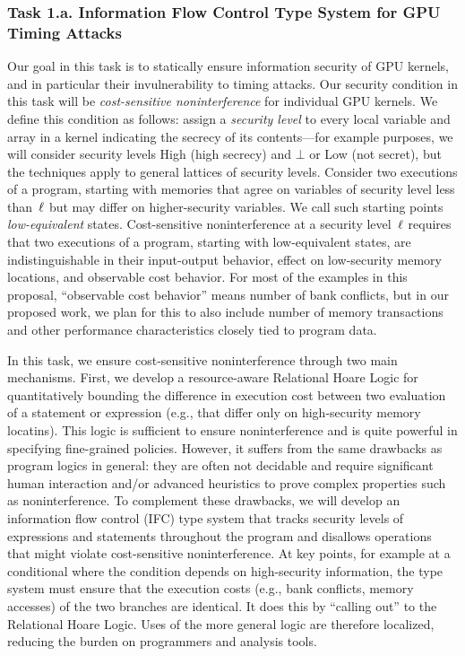 \subsubsection{Task 1.a. Information Flow Control Type System for GPU Timing Attacks}

Our goal in this task is to statically ensure information security of GPU kernels, and in particular their invulnerability to timing attacks.
%
Our security condition in this task will be {\em cost-sensitive noninterference}  for individual GPU kernels.
%
We define this condition as follows: assign a {\em security level} to every local variable and array in a kernel indicating the secrecy of its contents---for example purposes, we will consider security levels High (high secrecy) and $\bot$ or Low (not secret), but the techniques apply to general lattices of security levels.
%
Consider two executions of a program, starting with memories that agree on variables of security level less than~$\ell$ but may differ on higher-security variables.
%
We call such starting points {\em low-equivalent} states.
%
Cost-sensitive noninterference at a security level~$\ell$ requires that two executions of a program, starting with low-equivalent states, are indistinguishable in their input-output behavior, effect on low-security memory locations, and observable cost behavior.
%
For most of the examples in this proposal, ``observable cost behavior'' means number of bank conflicts, but in our proposed work, we plan for this to also include number of memory transactions and other performance characteristics closely tied to program data.

In this task, we ensure cost-sensitive noninterference through two main mechanisms.
%
First, we develop a resource-aware Relational Hoare Logic for quantitatively bounding the difference in execution cost between two evaluation of a statement or expression (e.g., that differ only on high-security memory locatins).
%
This logic is sufficient to ensure noninterference and is quite powerful in specifying fine-grained policies.
%
However, it suffers from the same drawbacks as program logics in general: they are often not decidable and require significant human interaction and/or advanced heuristics to prove complex properties such as noninterference.
%
To complement these drawbacks, we will develop an information flow control (IFC) type system that tracks security levels of expressions and statements throughout the program and disallows operations that might violate cost-sensitive noninterference.
%
At key points, for example at a conditional where the condition depends on high-security information, the type system must ensure that the execution costs (e.g., bank conflicts, memory accesses) of the two branches are identical.
%
It does this by ``calling out'' to the Relational Hoare Logic.
%
Uses of the more general logic are therefore localized, reducing the burden on programmers and analysis tools.

